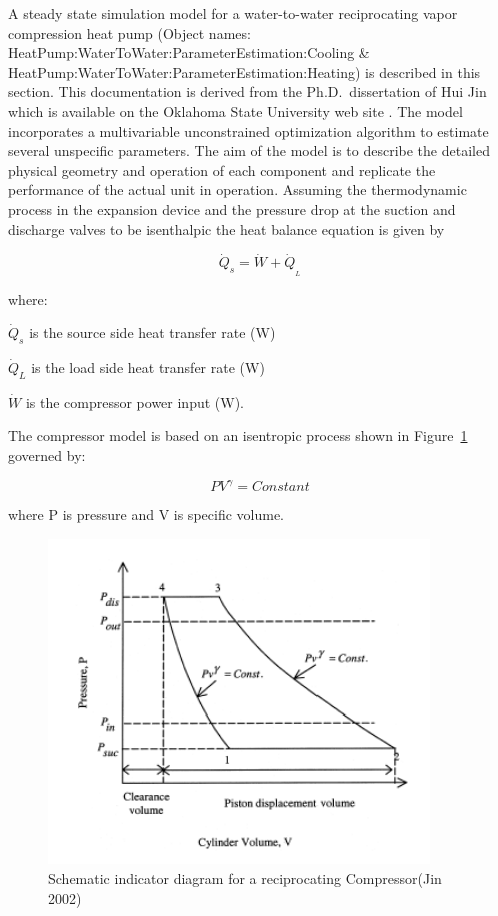 A steady state simulation model for a water-to-water reciprocating vapor compression heat pump (Object names: HeatPump:WaterToWater:ParameterEstimation:Cooling \& HeatPump:WaterToWater:ParameterEstimation:Heating) is described in this section. This documentation is derived from the Ph.D.~dissertation of Hui Jin which is available on the Oklahoma State University web site . The model incorporates a multivariable unconstrained optimization algorithm to estimate several unspecific parameters. The aim of the model is to describe the detailed physical geometry and operation of each component and replicate the performance of the actual unit in operation. Assuming the thermodynamic process in the expansion device and the pressure drop at the suction and discharge valves to be isenthalpic the heat balance equation is given by

\begin{equation}
{\dot Q_s} = \dot W + {\dot Q_{_L}}
\end{equation}

where:

\({\dot Q_s}\) is the source side heat transfer rate (W)

\({\dot Q_L}\) is the load side heat transfer rate (W)

\(\dot W\) is the compressor power input (W).

The compressor model is based on an isentropic process shown in Figure~\ref{fig:schematic-indicator-diagram-for-a} governed by:

\begin{equation}
{PV^{\gamma}} = Constant
\end{equation}

where P is pressure and V is specific volume.

\begin{figure}[hbtp] %
\centering
\includegraphics[width=0.9\textwidth, height=0.9\textheight, keepaspectratio=true]{media/image5296.png}
\caption{Schematic indicator diagram for a reciprocating Compressor(Jin 2002) \protect \label{fig:schematic-indicator-diagram-for-a}}
\end{figure}

